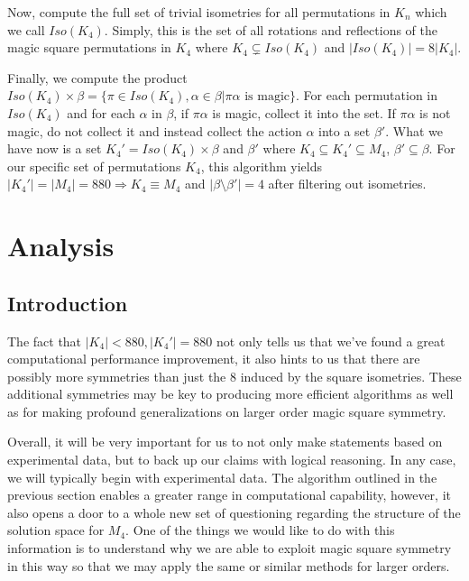 \documentclass[12pt]{report}
\begin{document}
\par Now, compute the full set of trivial isometries for all permutations in $K_n$ which we call $Iso(K_4)$. Simply,
this is the set of all rotations and reflections of the magic square permutations in $K_4$ where $K_4\subsetneq Iso(K_4)$
and $|Iso(K_4)| = 8|K_4|$.

\par Finally, we compute the product $Iso(K_4)\times\beta = \{\pi\in Iso(K_4),\alpha\in\beta | \pi\alpha \text{ is magic}\}$. 
For each permutation in $Iso(K_4)$ and for each $\alpha$ in $\beta$, if $\pi\alpha$ is magic, collect it into the set. If $\pi\alpha$
is not magic, do not collect it and instead collect the action $\alpha$ into a set ${\beta}\prime$. What we have now is a set ${K_4}\prime = Iso(K_4)\times\beta$ and ${\beta}\prime$
where $K_4 \subseteq {K_4}\prime \subseteq M_4$, ${\beta}\prime \subseteq \beta$. For our specific set of permutations $K_4$, this algorithm yields
$|K_4 \prime| = |M_4| = 880 \Rightarrow K_4 \equiv M_4$ and $|\beta \setminus{\beta}\prime| = 4$ after filtering out isometries.

\chapter{Analysis}

\section{Introduction} The fact that $\left|K_4\right|< 880, \left|{K_4}\prime\right|=880$ not only tells us that we've found a great computational performance
improvement, it also hints to us that there are possibly more symmetries than just the 8 induced by
the square isometries. These additional symmetries may be key to producing more
efficient algorithms as well as for making profound generalizations on larger order magic square
symmetry.

\par Overall, it will be very important for us to not only make statements based on experimental
data, but to back up our claims with logical reasoning. In any case, we will typically begin with
experimental data. The algorithm outlined in the previous section enables a greater range in
computational capability, however, it also opens a door to a whole new set of questioning regarding
the structure of the solution space for $M_4$. One of the things we would like to do with this
information is to understand why we are able to exploit magic square symmetry in this way so that
we may apply the same or similar methods for larger orders.
\end{document}
